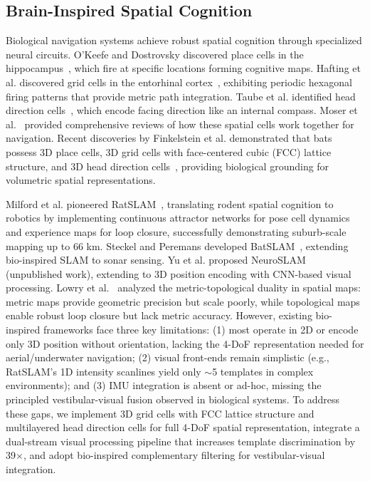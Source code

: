 \subsection{Brain-Inspired Spatial Cognition}
\label{sec:related_bio}

Biological navigation systems achieve robust spatial cognition through specialized neural circuits. O'Keefe and Dostrovsky discovered place cells in the hippocampus~\cite{OKeefe1971}, which fire at specific locations forming cognitive maps. Hafting et al. discovered grid cells in the entorhinal cortex~\cite{Hafting2005}, exhibiting periodic hexagonal firing patterns that provide metric path integration. Taube et al. identified head direction cells~\cite{Taube1990}, which encode facing direction like an internal compass. Moser et al.~\cite{Moser2017} provided comprehensive reviews of how these spatial cells work together for navigation. Recent discoveries by Finkelstein et al. demonstrated that bats possess 3D place cells, 3D grid cells with face-centered cubic (FCC) lattice structure, and 3D head direction cells~\cite{finkelstein2015three, finkelstein2016three}, providing biological grounding for volumetric spatial representations.

Milford et al. pioneered RatSLAM~\cite{milford2004ratslam, milford2008mapping}, translating rodent spatial cognition to robotics by implementing continuous attractor networks for pose cell dynamics and experience maps for loop closure, successfully demonstrating suburb-scale mapping up to 66 km. Steckel and Peremans developed BatSLAM~\cite{steckel2013batslam}, extending bio-inspired SLAM to sonar sensing. Yu et al. proposed NeuroSLAM (unpublished work), extending to 3D position encoding with CNN-based visual processing. Lowry et al.~\cite{Lowry2016} analyzed the metric-topological duality in spatial maps: metric maps provide geometric precision but scale poorly, while topological maps enable robust loop closure but lack metric accuracy. However, existing bio-inspired frameworks face three key limitations: (1) most operate in 2D or encode only 3D position without orientation, lacking the 4-DoF representation needed for aerial/underwater navigation; (2) visual front-ends remain simplistic (e.g., RatSLAM's 1D intensity scanlines yield only $\sim$5 templates in complex environments); and (3) IMU integration is absent or ad-hoc, missing the principled vestibular-visual fusion observed in biological systems. To address these gaps, we implement 3D grid cells with FCC lattice structure and multilayered head direction cells for full 4-DoF spatial representation, integrate a dual-stream visual processing pipeline that increases template discrimination by 39$\times$, and adopt bio-inspired complementary filtering for vestibular-visual integration.

